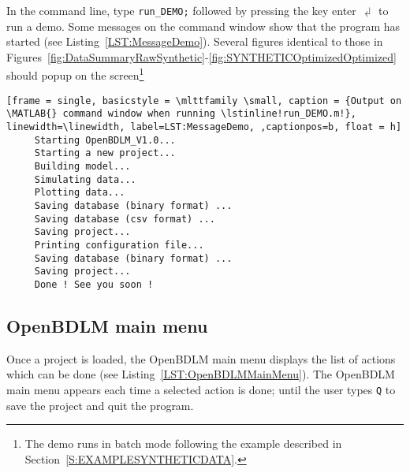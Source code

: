 In the \MATLAB{} command line, type  
\colorbox{light-gray}{\lstinline[basicstyle = \mlttfamily \small, backgroundcolor = \color{light-gray}]!run_DEMO;! }
 followed by pressing the key enter $\dlsh$ to run a demo. 
Some messages on the \MATLAB{} command window show that the program has started (see Listing~\ref{LST:MessageDemo}).
Several figures identical to those in Figures~\ref{fig:DataSummaryRawSynthetic}-\ref{fig:SYNTHETICOptimizedOptimized} should popup on the screen\footnote{The demo runs in batch mode following the example described in Section~\ref{S:EXAMPLESYNTHETICDATA}.}


\begin{lstlisting}[frame = single, basicstyle = \mlttfamily \small, caption = {Output on \MATLAB{} command window when running \lstinline!run_DEMO.m!}, linewidth=\linewidth, label=LST:MessageDemo, ,captionpos=b, float = h] 
     Starting OpenBDLM_V1.0...
     Starting a new project...
     Building model...
     Simulating data...
     Plotting data...
     Saving database (binary format) ...
     Saving database (csv format) ...
     Saving project...
     Printing configuration file...
     Saving database (binary format) ...
     Saving project...
     Done ! See you soon !
\end{lstlisting}



\subsection{OpenBDLM main menu}
\label{S:OPENBDLMMAINMENU}

Once a project is loaded, the OpenBDLM main menu displays the list of actions which can be done (see Listing~\ref{LST:OpenBDLMMainMenu}). 
The OpenBDLM main menu appears each time a selected action is done; until the user types \colorbox{light-gray}{\lstinline[basicstyle = \mlttfamily \small ]!Q!} to save the project and quit the program.

